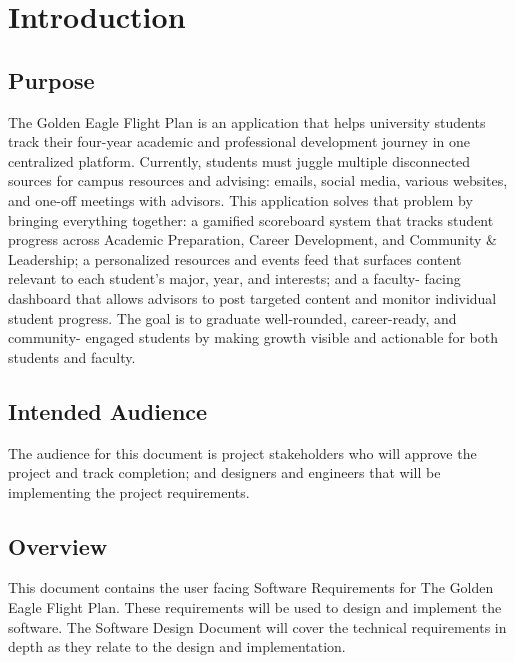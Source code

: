 \newcommand{\documentName}{Software Requirement Specification}
\newcommand{\shortDocumentName}{SRS}





\firstPageBlock

\newpage %
\section{Introduction}

\subsection{Purpose}
The Golden Eagle Flight Plan is an application that helps university students track their four-year academic and professional development journey in one centralized platform.
Currently, students must juggle multiple disconnected sources for campus resources and advising: emails, social media, various websites, and one-off meetings with advisors.
This application solves that problem by bringing everything together: a gamified scoreboard system that tracks student progress across Academic Preparation, Career
Development, and Community \& Leadership; a personalized resources and events feed that surfaces content relevant to each student's major, year, and interests; and a faculty-
facing dashboard that allows advisors to post targeted content and monitor individual student progress. The goal is to graduate well-rounded, career-ready, and community-
engaged students by making growth visible and actionable for both students and faculty.

\subsection{Intended Audience}
The audience for this document is project stakeholders who will approve the project and track completion; and designers and engineers that will be implementing the project requirements.

\subsection{Overview}
This document contains the user facing Software Requirements for The Golden Eagle Flight Plan.
These requirements will be used to design and implement the software.
The Software Design Document will cover the technical requirements in depth as they relate to the design and implementation.

